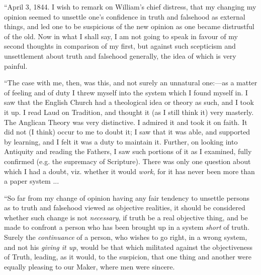 ``April 3, 1844. I wish to remark on William's chief
distress, that my changing my opinion seemed to unsettle one's
confidence in truth and falsehood as external things, and led one to be
suspicious of the new opinion as one became distrustful of the old. Now
in what I shall say, I am not going to speak in favour of my second
thoughts in comparison of my first, but against such scepticism and
unsettlement about truth and falsehood generally, the idea of which is
very painful.

``The case with me, then, was this, and not surely an unnatural
one:—as a matter of feeling and of duty I threw myself into the system
which I found myself in. I saw that the English Church had a theological
idea or theory as such, and I took it up. I read Laud on Tradition, and
thought it (as I still think it) very masterly. The Anglican Theory was
very distinctive. I admired it and took it on faith. It did not (I
think) occur to me to doubt it; I saw that it was able, and supported by
learning, and I felt it was a duty to maintain it. Further, on looking
into Antiquity and reading the Fathers, I saw such portions of it as I
examined, fully confirmed (e.g. the supremacy of Scripture). There was
only one question about which I had a doubt, viz. whether it would \emph{work},
for it has never been more than a paper system ...

``So far from my change of opinion having any fair tendency to
unsettle persons as to truth and falsehood viewed as objective
realities, it should be considered whether such change is not \emph{necessary},
if truth be a real objective thing, and be made to confront a person who
has been brought up in a system \emph{short} of truth. Surely the \emph{continuance}
of a person, who wishes to go right, in a wrong system,
and not his \emph{giving it up}, would be that which militated against
the objectiveness of Truth, leading, as it would, to the suspicion, that
one thing and another were equally pleasing to our Maker, where men were
sincere.

